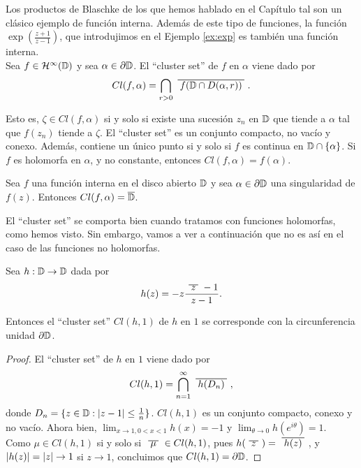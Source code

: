 Los productos de Blaschke de los que hemos hablado en el Capítulo tal son un clásico ejemplo de función interna. Además de este tipo de funciones, la función $\exp{\left(\frac{z + 1}{z - 1}\right)}$, que introdujimos en el Ejemplo \ref{ex:exp} es también una función interna. \\

Sea $f \in \mathcal{H}^{\infty}(\mathbb{D})$ y sea $\alpha \in \partial \mathbb{D}$. El ``cluster set'' de $f$ en $\alpha$ viene dado por
\begin{equation}
    Cl(f, \alpha) = \bigcap_{r>0} \xbar{f(\disk \cap D(\alpha, r))}.
\end{equation}

Esto es, $\zeta \in Cl(f, \alpha)$ si y solo si existe una sucesión $z_n$ en $\mathbb{D}$ que tiende a $\alpha$ tal que $f(z_n)$ tiende a $\zeta$. El ``cluster set'' es un conjunto compacto, no vacío y conexo. Además, contiene un único punto si y solo si $f$ es continua en $\mathbb{D} \cap \{\alpha\}$. Si $f$ es holomorfa en $\alpha$, y no constante, entonces $Cl(f, \alpha) = f(\alpha)$. \\

\begin{theorem}
    Sea $f$ una función interna en el disco abierto $\mathbb{D}$ y sea $\alpha \in \partial \mathbb{D}$ una singularidad de $f(z)$. Entonces $Cl(f, \alpha) = \overline{\mathbb{D}}$.
\end{theorem}

El ``cluster set'' se comporta bien cuando tratamos con funciones holomorfas, como hemos visto. Sin embargo, vamos a ver a continuación que no es así en el caso de las funciones no holomorfas.

\begin{example}
    Sea $h: \mathbb{D} \to \mathbb{D}$ dada por
    \begin{equation*}
        h(z) = -z \frac{\xbar{z} -1}{z - 1}.
    \end{equation*}

    Entonces el ``cluster set'' $Cl(h,1)$ de $h$ en $1$ se corresponde con la circunferencia unidad $\partial \mathbb{D}$.
\end{example}

\begin{proof}
    El ``cluster set'' de $h$ en $1$ viene dado por
    \begin{equation*}
        Cl(h,1) = \bigcap_{n=1}^{\infty} \xbar{h(D_n)},
    \end{equation*}
    donde $D_n = \{z \in \mathbb{D} : \left\lvert z-1\right\rvert \leq \frac{1}{n}\}$. $Cl(h,1)$ es un conjunto compacto, conexo y no vacío. Ahora bien, $\lim_{x \to 1, 0 < x < 1} h(x) = -1$ y $\lim_{\theta \to 0} h(e^{i \theta}) = 1$. \\

    Como $\mu \in Cl(h,1)$ si y solo si $\xbar{\mu} \in Cl(h,1)$, pues $h(\xbar{z}) = \xbar{h(z)}$, y $\left\lvert h(z)\right\rvert = \left\lvert z\right\rvert \to 1$ si $z \to 1$, concluimos que $Cl(h,1) = \partial \mathbb{D}$.
\end{proof}
